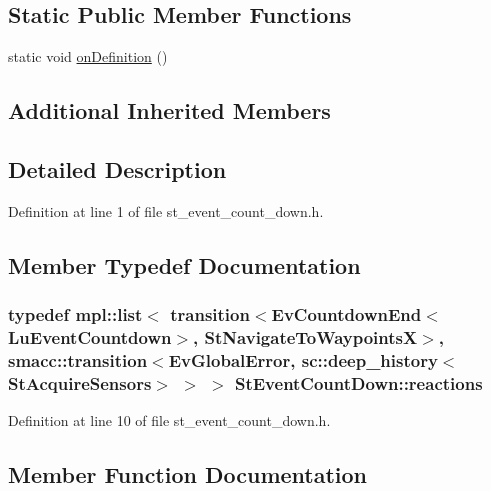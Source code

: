 \subsection*{Static Public Member Functions}
\begin{DoxyCompactItemize}
\item 
static void \hyperlink{structStEventCountDown_ada70c5ec43bcf80479b87523f880ff9f}{on\+Definition} ()
\end{DoxyCompactItemize}
\subsection*{Additional Inherited Members}


\subsection{Detailed Description}


Definition at line 1 of file st\+\_\+event\+\_\+count\+\_\+down.\+h.



\subsection{Member Typedef Documentation}
\subsubsection[{\texorpdfstring{reactions}{reactions}}]{\setlength{\rightskip}{0pt plus 5cm}typedef mpl\+::list$<$ transition$<$Ev\+Countdown\+End$<$Lu\+Event\+Countdown$>$, {\bf St\+Navigate\+To\+WaypointsX}$>$, {\bf smacc\+::transition}$<$Ev\+Global\+Error, sc\+::deep\+\_\+history$<${\bf St\+Acquire\+Sensors}$>$ $>$ $>$ {\bf St\+Event\+Count\+Down\+::reactions}}\hypertarget{structStEventCountDown_a6cbed99d43a19cad677e33c60f4cfdfc}{}\label{structStEventCountDown_a6cbed99d43a19cad677e33c60f4cfdfc}


Definition at line 10 of file st\+\_\+event\+\_\+count\+\_\+down.\+h.



\subsection{Member Function Documentation}

